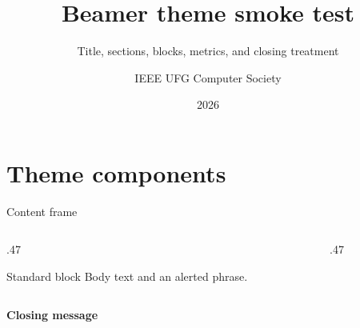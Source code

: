 \documentclass[aspectratio=169]{beamer}
\title[Smoke test]{Beamer theme smoke test}
\subtitle{Title, sections, blocks, metrics, and closing treatment}
\author{IEEE UFG Computer Society}
\institute{Universidade Federal de Goiás}
\date{2026}
\begin{document}
\begin{frame}
  \titlepage
\end{frame}

\section{Theme components}

\begin{frame}{Content frame}
  \begin{columns}[T,onlytextwidth]
    \begin{column}{.47\textwidth}
      \begin{block}{Standard block}
        Body text and an \alert{alerted phrase}.
      \end{block}
    \end{column}
    \begin{column}{.47\textwidth}
    \end{column}
  \end{columns}
\end{frame}

{
  \begin{frame}[plain]
    \centering
    \vfill
    {\IEEECSHeadingFont\bfseries\LARGE Closing message\par}
    \vfill
  \end{frame}
}
\end{document}
